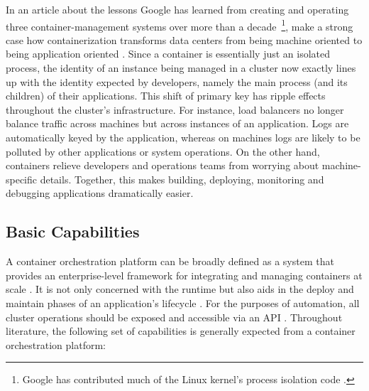 In an article about the lessons Google has learned from creating and operating three container-management systems over more than a decade~\footnote{Google has contributed much of the Linux kernel's process isolation code \cite[p.~50]{burns2016borg}.}, \citeauthor{burns2016borg} make a strong case how containerization transforms data centers from being machine oriented to being application oriented \cite[pp.~52--53]{burns2016borg}. Since a container is essentially just an isolated process, the identity of an instance being managed in a cluster now exactly lines up with the identity expected by developers, namely the main process (and its children) of their applications. This shift of primary key has ripple effects throughout the cluster's infrastructure. For instance, load balancers no longer balance traffic across machines but across instances of an application. Logs are automatically keyed by the application, whereas on machines logs are likely to be polluted by other applications or system operations. On the other hand, containers relieve developers and operations teams from worrying about machine-specific details. Together, this makes building, deploying, monitoring and debugging applications dramatically easier.


\subsection{Basic Capabilities}
\label{sec:container-orchestration-platform-capabilities}

A container orchestration platform can be broadly defined as a system that provides an enterprise-level framework for integrating and managing containers at scale \cite[p.~44]{khan2017key}. It is not only concerned with the runtime but also aids in the deploy and maintain phases of an application's lifecycle \cite[p.~225]{casalicchio2019container}. For the purposes of automation, all cluster operations should be exposed and accessible via an \acs{API} \cite[p.~224]{casalicchio2019container} \cite[p.~29]{pahl2015containerization}. Throughout literature, the following set of capabilities is generally expected from a container orchestration platform:

